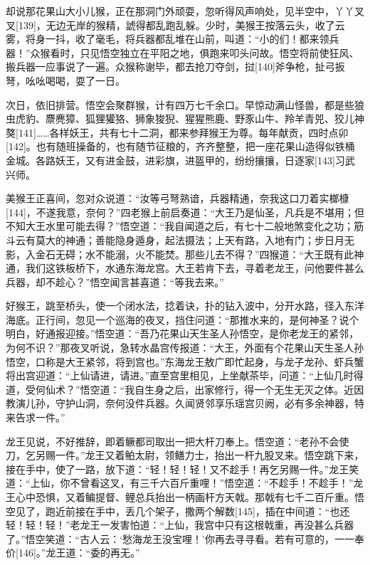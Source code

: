 \documentclass[12pt,UTF8]{ctexbook}
\begin{document}
却说那花果山大小儿猴，正在那洞门外顽耍，忽听得风声响处，见半空中，丫丫叉叉[139]，无边无岸的猴精，諕得都乱跑乱躲。少时，美猴王按落云头，收了云雾，将身一抖，收了毫毛，将兵器都乱堆在山前，叫道：“小的们！都来领兵器！”众猴看时，只见悟空独立在平阳之地，俱跑来叩头问故。悟空将前使狂风、搬兵器一应事说了一遍。众猴称谢毕，都去抢刀夺剑，挝[140]斧争枪，扯弓扳弩，吆吆喝喝，耍了一日。

次日，依旧排营。悟空会聚群猴，计有四万七千余口。早惊动满山怪兽，都是些狼虫虎豹、麖麂獐、狐狸獾狢、狮象狻猊、猩猩熊鹿、野豕山牛、羚羊青兕、狡儿神獒[141]……各样妖王，共有七十二洞，都来参拜猴王为尊。每年献贡，四时点卯[142]。也有随班操备的，也有随节征粮的，齐齐整整，把一座花果山造得似铁桶金城。各路妖王，又有进金鼓，进彩旗，进盔甲的，纷纷攘攘，日逐家[143]习武兴师。

美猴王正喜间，忽对众说道：“汝等弓弩熟谙，兵器精通，奈我这口刀着实榔槺[144]，不遂我意，奈何？”四老猴上前启奏道：“大王乃是仙圣，凡兵是不堪用；但不知大王水里可能去得？”悟空道：“我自闻道之后，有七十二般地煞变化之功；筋斗云有莫大的神通；善能隐身遁身，起法摄法；上天有路，入地有门；步日月无影，入金石无碍；水不能溺，火不能焚。那些儿去不得？”四猴道：“大王既有此神通，我们这铁板桥下，水通东海龙宫。大王若肯下去，寻着老龙王，问他要件甚么兵器，却不趁心？”悟空闻言甚喜道：“等我去来。”

好猴王，跳至桥头，使一个闭水法，捻着诀，扑的钻入波中，分开水路，径入东洋海底。正行间，忽见一个巡海的夜叉，挡住问道：“那推水来的，是何神圣？说个明白，好通报迎接。”悟空道：“吾乃花果山天生圣人孙悟空，是你老龙王的紧邻，为何不识？”那夜叉听说，急转水晶宫传报道：“大王，外面有个花果山天生圣人孙悟空，口称是大王紧邻，将到宫也。”东海龙王敖广即忙起身，与龙子龙孙、虾兵蟹将出宫迎道：“上仙请进，请进。”直至宫里相见，上坐献茶毕，问道：“上仙几时得道，受何仙术？”悟空道：“我自生身之后，出家修行，得一个无生无灭之体。近因教演儿孙，守护山洞，奈何没件兵器。久闻贤邻享乐瑶宫贝阙，必有多余神器，特来告求一件。”

龙王见说，不好推辞，即着鳜都司取出一把大杆刀奉上。悟空道：“老孙不会使刀，乞另赐一件。”龙王又着鲌太尉，领鳝力士，抬出一杆九股叉来。悟空跳下来，接在手中，使了一路，放下道：“轻！轻！轻！又不趁手！再乞另赐一件。”龙王笑道：“上仙，你不曾看这叉，有三千六百斤重哩！”悟空道：“不趁手！不趁手！”龙王心中恐惧，又着鳊提督、鲤总兵抬出一柄画杆方天戟。那戟有七千二百斤重。悟空见了，跑近前接在手中，丢几个架子，撒两个解数[145]，插在中间道：“也还轻！轻！轻！”老龙王一发害怕道：“上仙，我宫中只有这根戟重，再没甚么兵器了。”悟空笑道：“古人云：‘愁海龙王没宝哩！’你再去寻寻看。若有可意的，一一奉价[146]。”龙王道：“委的再无。”
\end{document}
